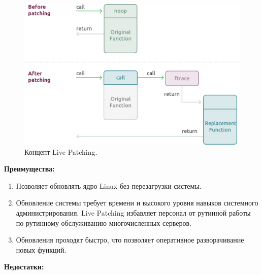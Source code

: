 \begin{figure}[h]
    \centering
    \includegraphics[width=\textwidth]{inc/img/Livepatch}
    \caption{Концепт Live Patching.}
    \label{fig:Livepatch}
\end{figure}

\textbf{Преимущества:}

\begin{enumerate}
    \item Позволяет обновлять ядро Linux без перезагрузки системы.
    \item Обновление системы требует времени и высокого уровня навыков системного администрирования.
    Live Patching избавляет персонал от рутинной работы по рутинному обслуживанию многочисленных серверов.
    \item Обновления проходят быстро, что позволяет оперативное разворачивание новых функций.
\end{enumerate}

\textbf{Недостатки:}

